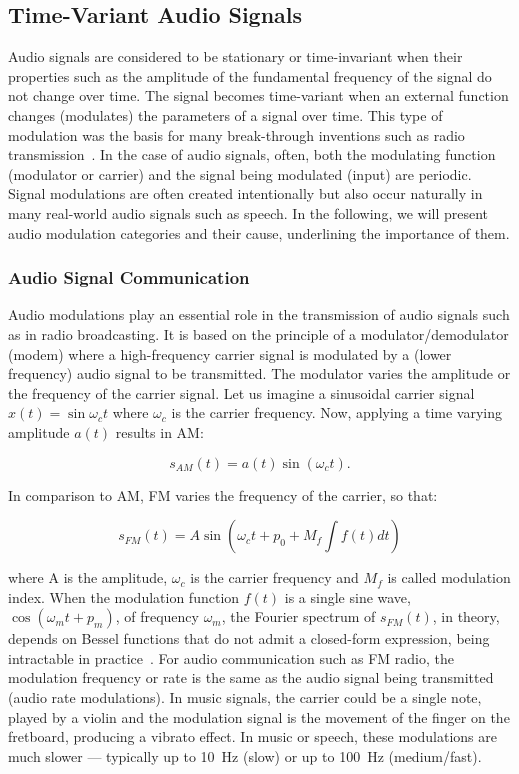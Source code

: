 \subsection{Time-Variant Audio Signals}\label{sub:time-variant-audio-signals}

Audio signals are considered to be stationary or time-invariant when their properties such as the amplitude of the fundamental frequency of the signal do not change over time.
The signal becomes time-variant when an external function changes (modulates) the parameters of a signal over time.
This type of modulation was the basis for many break-through inventions such as radio transmission~\cite{shannon48}.
In the case of audio signals, often, both the modulating function (modulator or carrier) and the signal being modulated (input) are periodic.
Signal modulations are often created intentionally but also occur naturally in many real-world audio signals such as speech.
In the following, we will present audio modulation categories and their cause, underlining the importance of them.

\subsubsection*{Audio Signal Communication}

Audio modulations play an essential role in the transmission of audio signals such as in radio broadcasting.
It is based on the principle of a modulator/demodulator (modem) where a high-frequency carrier signal is modulated by a (lower frequency) audio signal to be transmitted.
The modulator varies the amplitude or the frequency of the carrier signal.
Let us imagine a sinusoidal carrier signal $x(t) = \sin \omega_c t$ where $\omega_c$ is the carrier frequency. Now, applying a time varying amplitude $a(t)$ results in \ac{AM}:

\begin{equation*}
    s_{AM}(t) = a(t) \sin \left( \omega_{c} t\right).
\end{equation*}

In comparison to \acs{AM}, \ac{FM} varies the frequency of the carrier, so that:

\begin{equation*}
    s_{FM}(t) = A \sin \left( \omega_{c} t + p_0 + M_f \int f(t) dt \right)
\end{equation*}

where A is the amplitude, $\omega_{c}$ is the carrier frequency and $M_f$ is called modulation index.
When the modulation function $f(t)$ is a single sine wave, $\cos \left(\omega_{m} t+p_{m}\right)$, of frequency $\omega_{m}$, the Fourier spectrum of $s_{FM}(t)$, in theory, depends on Bessel functions that do not admit a closed-form expression, being intractable in practice~\cite{abramowitz64}.
For audio communication such as \acs{FM} radio, the modulation frequency or rate is the same as the audio signal being transmitted (audio rate modulations).
In music signals, the carrier could be a single note, played by a violin and the modulation signal is the movement of the finger on the fretboard, producing a vibrato effect.
In music or speech, these modulations are much slower --- typically up to 10~\si{\hertz} (slow) or up to 100~\si{\hertz} (medium/fast).

